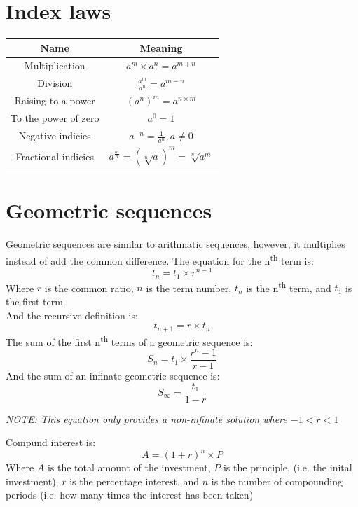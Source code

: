 \documentclass[a4paper,10pt]{report}
\begin{document}
\section{Index laws}
\begin{center}
	\begin{tabular}{c|c}
		Name                 & Meaning                                             \\ \hline
		Multiplication       & $a^m \times a^n = a^{m + n}$                        \\
		Division             & $\frac{a^m}{a^n} = a^{m - n}$                       \\
		Raising to a power   & $(a^n)^m = a^{n \times m}$                          \\
		To the power of zero & $a^0 = 1$                                           \\
		Negative indicies    & $a^{-n} = \frac{1}{a^n}, a \not = 0$                \\
		Fractional indicies  & $a^{\frac{m}{n}} = (\sqrt[n]{a})^m = \sqrt[n]{a^m}$
	\end{tabular}
\end{center}

\section{Geometric sequences}
Geometric sequences are similar to arithmatic sequences, however, it multiplies instead of add the common difference.  The equation for the n\textsuperscript{th} term is:
$$
    t_n = t_1 \times r^{n - 1}
$$
Where $r$ is the common ratio, $n$ is the term number, $t_n$ is the n\textsuperscript{th} term, and $t_1$ is the first term.\\
And the recursive definition is:
$$
    t_{n + 1} = r \times t_n
$$
The sum of the first n\textsuperscript{th} terms of a geometric sequence is:
$$
    S_n = t_1 \times \frac{r^n - 1}{r - 1}
$$
And the sum of an infinate geometric sequence is:
$$
    S_{\infty} = \frac{t_1}{1 - r}
$$
\begin{center}
    \emph{NOTE: This equation only provides a non-infinate solution where $-1 < r < 1$}
\end{center}

Compund interest is:
$$
    A = (1 + r)^n \times P
$$
Where $A$ is the total amount of the investment, $P$ is the principle, (i.e. the inital investment), $r$ is the percentage interest, and $n$ is the number of compounding periods (i.e. how many times the interest has been taken)
\end{document}
